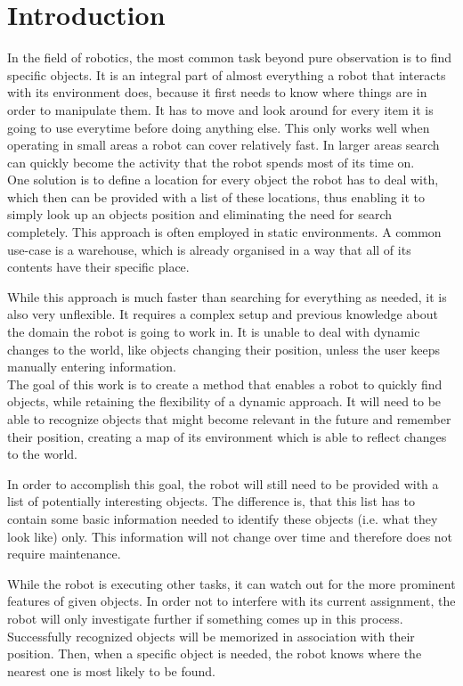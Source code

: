 \chapter{Introduction}
\label{chap:intro}
In the field of robotics, the most common task beyond pure observation is to find specific objects. It is an integral part of almost everything a robot that interacts with its environment does, because it first needs to know where things are in order to manipulate them. It has to move and look around for every item it is going to use everytime before doing anything else. This only works well when operating in small areas a robot can cover relatively fast. In larger areas search can quickly become the activity that the robot spends most of its time on. \\

One solution is to define a location for every object the robot has to deal with, which then can be provided with a list of these locations, thus enabling it to simply look up an objects position and eliminating the need for search completely. This approach is often employed in static environments. A common use-case is a warehouse, which is already organised in a way that all of its contents have their specific place.

While this approach is much faster than searching for everything as needed, it is also very unflexible. It requires a complex setup and previous knowledge about the domain the robot is going to work in. It is unable to deal with dynamic changes to the world, like objects changing their position, unless the user keeps manually entering information. \\

The goal of this work is to create a method that enables a robot to quickly find objects, while retaining the flexibility of a dynamic approach. It will need to be able to recognize objects that might become relevant in the future and remember their position, creating a map of its environment which is able to reflect changes to the world.

In order to accomplish this goal, the robot will still need to be provided with a list of potentially interesting objects. The difference is, that this list has to contain some basic information needed to identify these objects (i.e. what they look like) only. This information will not change over time and therefore does not require maintenance.

While the robot is executing other tasks, it can watch out for the more prominent features of given objects. In order not to interfere with its current assignment, the robot will only investigate further if something comes up in this process. Successfully recognized objects will be memorized in association with their position. Then, when a specific object is needed, the robot knows where the nearest one is most likely to be found. \\

